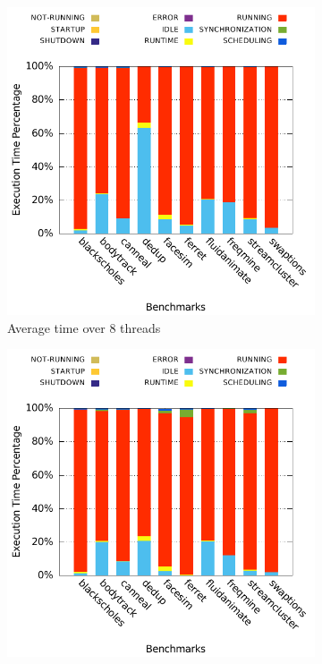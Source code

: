 \begin{figure}[p]
  \centering
  \begin{subfigure}{0.75\textwidth}
                \includegraphics[width=\textwidth]{task_benchmarks/figures/worker-runtime-breakdowns-8}
                \caption{Average time over 8 threads}
                \label{fig:runtime_breakdown_8}
  \end{subfigure}
	\hfill
  \begin{subfigure}{0.75\textwidth}
                \includegraphics[width=\textwidth]{task_benchmarks/figures/master-runtime-breakdowns-8}

\end{subfigure}
\end{figure}
